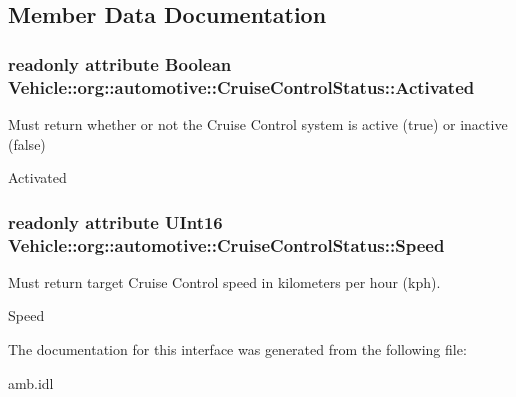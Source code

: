 \subsection{Member Data Documentation}
\hypertarget{interfaceVehicle_1_1org_1_1automotive_1_1CruiseControlStatus_ac09eab99f7e13e714e800d2f911075b5}{
\subsubsection[{Activated}]{\setlength{\rightskip}{0pt plus 5cm}readonly attribute Boolean Vehicle\-::org\-::automotive\-::\-Cruise\-Control\-Status\-::\-Activated}}\label{interfaceVehicle_1_1org_1_1automotive_1_1CruiseControlStatus_ac09eab99f7e13e714e800d2f911075b5}


Must return whether or not the Cruise Control system is active (true) or inactive (false) 

Activated \hypertarget{interfaceVehicle_1_1org_1_1automotive_1_1CruiseControlStatus_a80ab2364136467fe957abaa155981ca2}{
\subsubsection[{Speed}]{\setlength{\rightskip}{0pt plus 5cm}readonly attribute U\-Int16 Vehicle\-::org\-::automotive\-::\-Cruise\-Control\-Status\-::\-Speed}}\label{interfaceVehicle_1_1org_1_1automotive_1_1CruiseControlStatus_a80ab2364136467fe957abaa155981ca2}


Must return target Cruise Control speed in kilometers per hour (kph). 

Speed 

The documentation for this interface was generated from the following file\-:\begin{DoxyCompactItemize}
\item 
amb.\-idl\end{DoxyCompactItemize}
